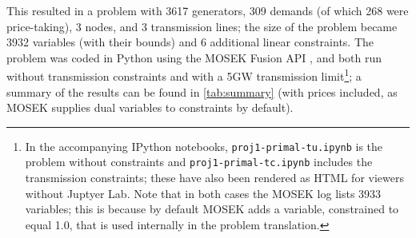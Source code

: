 \documentclass[11pt,a4paper]{article}
\numberwithin{equation}{section}
\begin{document}
This resulted in a problem with 3617 generators, 309 demands (of which 268 were price-taking), 3 nodes, and 3 transmission lines; the size of the problem became 3932 variables (with their bounds) and 6 additional linear constraints.
The problem was coded in Python using the MOSEK Fusion API \cite{mosekapsMOSEKFusionAPI2021}, and both run without transmission constraints and with a 5GW transmission limit\footnote{
In the accompanying IPython notebooks, \texttt{proj1-primal-tu.ipynb} is the problem without constraints and \texttt{proj1-primal-tc.ipynb} includes the transmission constraints; these have also been rendered as HTML for viewers without Juptyer Lab.
Note that in both cases the MOSEK log lists 3933 variables; this is because by default MOSEK adds a variable, constrained to equal 1.0, that is used internally in the problem translation.
}; a summary of the results can be found in \cref{tab:summary} (with prices included, as MOSEK supplies dual variables to constraints by default).

\begin{table}[htbp]
    \centering

    \caption{Market clearing summary}
    \label{tab:summary}
\end{table}
\end{document}
